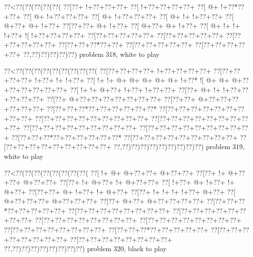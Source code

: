 \vbox{\vbox{\goo
\0??<\0??(\0??(\0??(\0??(\0??(
\0??[\0??+\- !+\0??+\0??+\0??+
\0??[\- !+\0??+\0??+\0??+\0??+
\0??[\- @+\- !+\0??*\0??+\0??+
\0??[\- @+\- !+\0??+\0??+\0??+
\0??[\- @+\- !+\0??+\0??+\0??+
\0??[\- @+\- !+\- !+\0??+\0??+
\0??[\- @+\0??+\- @+\- !+\0??+
\0??[\0??+\0??+\- @+\- !+\0??+
\0??[\- @+\0??+\- @+\- !+\0??+
\0??[\- @+\- !+\- !+\- !+\0??+
\- ![\- !+\0??+\0??+\0??+\0??+
\0??[\0??+\0??+\0??+\0??+\0??+
\0??[\0??+\0??+\0??+\0??+\0??+
\0??[\0??+\0??+\0??+\0??+\0??+
\0??[\0??+\0??+\0??*\0??+\0??+
\0??[\0??+\0??+\0??+\0??+\0??+
\0??[\0??+\0??+\0??+\0??+\0??+
\0??,\0??)\0??)\0??)\0??)\0??)
}
\hfil problem 318, white to play\hfil\break
}

\vbox{\vbox{\goo
\0??<\0??(\0??(\0??(\0??(\0??(\0??(\0??(\0??(\0??(
\0??[\0??+\0??+\0??+\0??+\- !+\0??+\0??+\0??+\0??+
\0??[\0??+\0??+\0??+\0??+\- !+\0??+\- !+\- !+\0??+
\0??[\- !+\- !+\- @+\- @+\- @+\- @+\- @+\- !+\0??*
\- ![\- @+\- @+\- @+\0??+\0??+\0??+\0??+\0??+\0??+
\0??[\- !+\- !+\- @+\0??+\- !+\0??+\- !+\0??+\0??+
\0??[\0??+\- @+\- !+\- !+\0??+\0??+\0??+\0??+\0??+
\0??[\0??+\- @+\0??+\0??+\0??+\0??+\0??+\0??+\0??+
\0??[\0??+\0??+\- @+\0??+\0??+\0??+\0??+\0??+\0??+
\0??[\0??+\0??+\0??*\0??+\0??+\0??+\0??+\0??+\0??*
\0??[\0??+\0??+\0??+\0??+\0??+\0??+\0??+\0??+\0??+
\0??[\0??+\0??+\0??+\0??+\0??+\0??+\0??+\0??+\0??+
\0??[\0??+\0??+\0??+\0??+\0??+\0??+\0??+\0??+\0??+
\0??[\0??+\0??+\0??+\0??+\0??+\0??+\0??+\0??+\0??+
\0??[\0??+\0??+\0??+\0??+\0??+\0??+\0??+\0??+\0??+
\0??[\0??+\0??+\0??*\0??+\0??+\0??+\0??+\0??+\0??*
\0??[\0??+\0??+\0??+\0??+\0??+\0??+\0??+\0??+\0??+
\0??[\0??+\0??+\0??+\0??+\0??+\0??+\0??+\0??+\0??+
\0??,\0??)\0??)\0??)\0??)\0??)\0??)\0??)\0??)\0??)
}
\hfil problem 319, white to play\hfil\break
}

\vbox{\vbox{\goo
\0??<\0??(\0??(\0??(\0??(\0??(\0??(\0??(\0??(
\0??[\- !+\- @+\- @+\0??+\0??+\- @+\0??+\0??+
\0??[\0??+\- !+\- @+\0??+\0??+\- @+\0??+\0??+
\0??[\0??+\- !+\- @+\0??+\- !+\- @+\0??+\0??+
\0??[\- !+\0??+\- @+\- !+\0??+\- !+\- @+\0??+
\0??[\0??+\0??+\- @+\- !+\0??+\- !+\- @+\0??+
\0??[\0??+\- !+\- !+\- !+\- !+\0??+\- @+\0??+
\0??[\- @+\0??+\0??+\0??+\- @+\0??+\0??+\0??+
\0??[\0??+\- @+\0??+\- @+\0??+\0??+\0??+\0??+
\0??[\0??+\0??+\0??*\0??+\0??+\0??+\0??+\0??+
\0??[\0??+\0??+\0??+\0??+\0??+\0??+\0??+\0??+
\0??[\0??+\0??+\0??+\0??+\0??+\0??+\0??+\0??+
\0??[\0??+\0??+\0??+\0??+\0??+\0??+\0??+\0??+
\0??[\0??+\0??+\0??+\0??+\0??+\0??+\0??+\0??+
\0??[\0??+\0??+\0??+\0??+\0??+\0??+\0??+\0??+
\0??[\0??+\0??+\0??*\0??+\0??+\0??+\0??+\0??+
\0??[\0??+\0??+\0??+\0??+\0??+\0??+\0??+\0??+
\0??[\0??+\0??+\0??+\0??+\0??+\0??+\0??+\0??+
\0??,\0??)\0??)\0??)\0??)\0??)\0??)\0??)\0??)
}
\hfil problem 320, black to play\hfil\break
}

